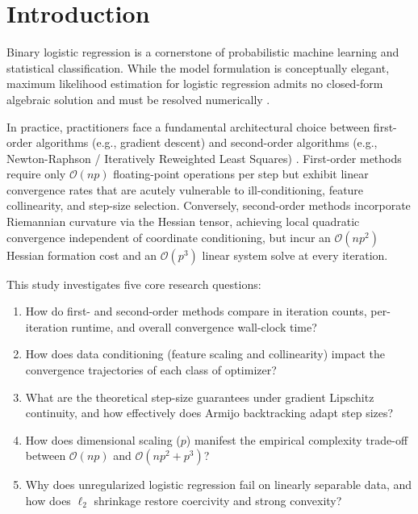 \documentclass[11pt,a4paper]{article}
\theoremstyle{remark}\newtheorem{remark}{Remark}
\begin{document}
\section{Introduction}
Binary logistic regression is a cornerstone of probabilistic machine learning and statistical classification. While the model formulation is conceptually elegant, maximum likelihood estimation for logistic regression admits no closed-form algebraic solution and must be resolved numerically \cite{hastie2009,bishop2006}.

In practice, practitioners face a fundamental architectural choice between first-order algorithms (e.g., gradient descent) and second-order algorithms (e.g., Newton-Raphson / Iteratively Reweighted Least Squares) \cite{nocedal2006,boyd2004}. First-order methods require only $\mathcal{O}(np)$ floating-point operations per step but exhibit linear convergence rates that are acutely vulnerable to ill-conditioning, feature collinearity, and step-size selection. Conversely, second-order methods incorporate Riemannian curvature via the Hessian tensor, achieving local quadratic convergence independent of coordinate conditioning, but incur an $\mathcal{O}(np^2)$ Hessian formation cost and an $\mathcal{O}(p^3)$ linear system solve at every iteration.

This study investigates five core research questions:
\begin{enumerate}[label=(\roman*)]
  \item How do first- and second-order methods compare in iteration counts, per-iteration runtime, and overall convergence wall-clock time?
  \item How does data conditioning (feature scaling and collinearity) impact the convergence trajectories of each class of optimizer?
  \item What are the theoretical step-size guarantees under gradient Lipschitz continuity, and how effectively does Armijo backtracking adapt step sizes?
  \item How does dimensional scaling ($p$) manifest the empirical complexity trade-off between $\mathcal{O}(np)$ and $\mathcal{O}(np^2 + p^3)$?
  \item Why does unregularized logistic regression fail on linearly separable data, and how does $\ell_2$ shrinkage restore coercivity and strong convexity?
\end{enumerate}
\end{document}
